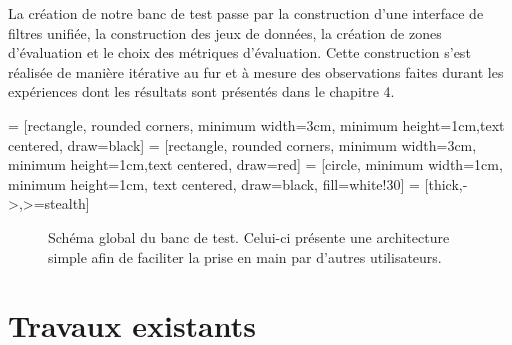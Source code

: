 La création de notre banc de test passe par la construction d'une interface de filtres unifiée, la construction des jeux de données, la création de zones d'évaluation et le choix des métriques d'évaluation. Cette construction s'est réalisée de manière itérative au fur et à mesure des observations faites durant les expériences dont les résultats sont présentés dans le chapitre 4.

 = [rectangle, rounded corners, minimum width=3cm, minimum height=1cm,text centered, draw=black]
 = [rectangle, rounded corners, minimum width=3cm, minimum height=1cm,text centered, draw=red]
 = [circle, minimum width=1cm, minimum height=1cm, text centered, draw=black, fill=white!30]
 = [thick,->,>=stealth]

\begin{figure}[!ht]
  \centering
  \caption{Schéma global du banc de test. Celui-ci présente une architecture simple afin de faciliter la prise en main par d'autres utilisateurs.}
  \label{fig:schéma banc de test}
\end{figure}

\section{Travaux existants}

